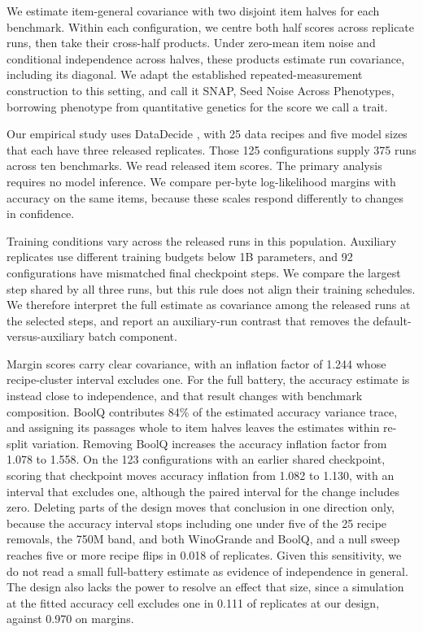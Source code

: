 \documentclass{article}
\begin{document}
We estimate item-general covariance with two disjoint item halves for each benchmark. Within each configuration, we centre both half scores across replicate runs, then take their cross-half products. Under zero-mean item noise and conditional independence across halves, these products estimate run covariance, including its diagonal. We adapt the established repeated-measurement construction to this setting, and call it SNAP, Seed Noise Across Phenotypes, borrowing phenotype from quantitative genetics for the score we call a trait.

Our empirical study uses DataDecide \citep{magnusson2025}, with 25 data recipes and five model sizes that each have three released replicates. Those 125 configurations supply 375 runs across ten benchmarks. We read released item scores. The primary analysis requires no model inference. We compare per-byte log-likelihood margins with accuracy on the same items, because these scales respond differently to changes in confidence.

Training conditions vary across the released runs in this population. Auxiliary replicates use different training budgets below 1B parameters, and 92 configurations have mismatched final checkpoint steps. We compare the largest step shared by all three runs, but this rule does not align their training schedules. We therefore interpret the full estimate as covariance among the released runs at the selected steps, and report an auxiliary-run contrast that removes the default-versus-auxiliary batch component.

Margin scores carry clear covariance, with an inflation factor of 1.244 whose recipe-cluster interval excludes one. For the full battery, the accuracy estimate is instead close to independence, and that result changes with benchmark composition. BoolQ contributes 84\% of the estimated accuracy variance trace, and assigning its passages whole to item halves leaves the estimates within re-split variation. Removing BoolQ increases the accuracy inflation factor from 1.078 to 1.558. On the 123 configurations with an earlier shared checkpoint, scoring that checkpoint moves accuracy inflation from 1.082 to 1.130, with an interval that excludes one, although the paired interval for the change includes zero. Deleting parts of the design moves that conclusion in one direction only, because the accuracy interval stops including one under five of the 25 recipe removals, the 750M band, and both WinoGrande and BoolQ, and a null sweep reaches five or more recipe flips in 0.018 of replicates. Given this sensitivity, we do not read a small full-battery estimate as evidence of independence in general. The design also lacks the power to resolve an effect that size, since a simulation at the fitted accuracy cell excludes one in 0.111 of replicates at our design, against 0.970 on margins.
\end{document}
